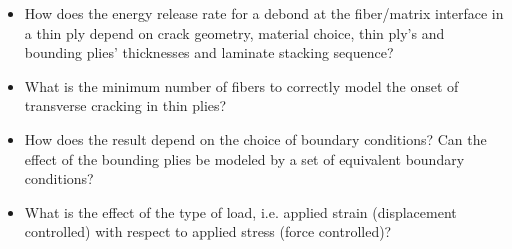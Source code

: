 \documentclass[a4paper]{jpconf}
\begin{document}
\begin{itemize}
\item How does the energy release rate for a debond at the fiber/matrix interface in a thin ply depend on crack geometry, material choice, thin ply's and bounding plies' thicknesses and laminate stacking sequence?
\item What is the minimum number of fibers to correctly model the onset of transverse cracking in thin plies?
\item How does the result depend on the choice of boundary conditions? Can the effect of the bounding plies be modeled by a set of equivalent boundary conditions?
\item What is the effect of the type of load, i.e. applied strain (displacement controlled) with respect to applied stress (force controlled)?
\end{itemize}
\end{document}
